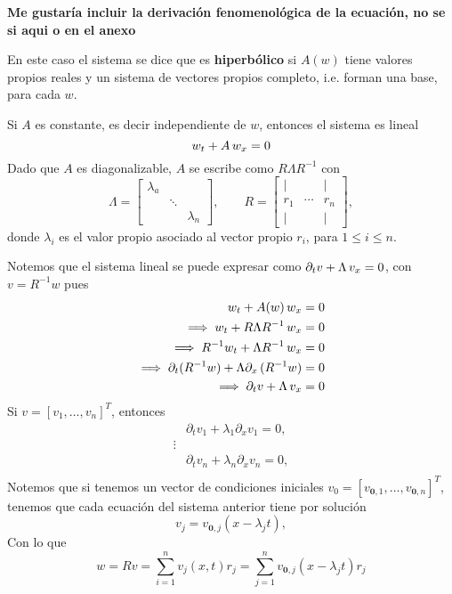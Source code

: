 \textbf{Me gustaría incluir la derivación fenomenológica de la ecuación, no se si aqui o en el anexo}

En este caso el sistema se dice que es \textbf{hiperbólico} si $A(w)$ tiene valores propios reales y un sistema de vectores propios completo, i.e. forman una base, para cada $w$.

Si $A$ es constante, es decir independiente de $w$, entonces el sistema es lineal
\[
w_t + A \thinspace w_x = 0
\]
Dado que $A$ es diagonalizable, $A$ se escribe como $R \Lambda R^{-1}$ con
\[
\Lambda = \begin{bmatrix} \lambda_a & & \\ & \ddots & \\ & & \lambda_n \end{bmatrix},
\qquad 
R = \begin{bmatrix}
    | &  & |\\
    r_1 & \cdots & r_n\\
    | &  & |
  \end{bmatrix},
\]
donde $\lambda_i$ es el valor propio asociado al vector propio $r_i$, para $1 \leq i \leq n$. 

Notemos que el sistema lineal se puede expresar como $\partial_t v + \Lambda \thinspace v_x = 0$, con $v = R^{-1} w$ pues
\begin{align*}
w_t + A(w) \thinspace w_x &= 0 \\
\implies w_t + R \Lambda R^{-1} \thinspace w_x &= 0 \\
\implies R^{-1} w_t + \Lambda R^{-1} \thinspace w_x &= 0 \\
\implies \partial_t(R^{-1} w) + \Lambda \partial_x \thinspace ( R^{-1} w) &= 0 \\
\implies \partial_t v + \Lambda \thinspace v_x &= 0
\end{align*}
Si $v = [v_1, \dots, v_n]^T $, entonces
\begin{align*}
&\partial_t v_1 + \lambda_1 \partial_x v_1 = 0, \\
\vdots \\
&\partial_t v_n + \lambda_n \partial_x v_n = 0, \\
\end{align*}
Notemos que si tenemos un vector de condiciones iniciales $v_0 = [v_{\textbf{0},1}, \dots, v_{\textbf{0},n}]^T$, tenemos que cada ecuación del sistema anterior tiene por solución
\[
v_j = v_{\textbf{0},j} (x - \lambda_j t),
\]
Con lo que 
\[
w = R v = \sum_{i=1}^n v_j(x,t) r_j = \sum_{j=1}^n v_{\textbf{0},j} (x - \lambda_j t) r_j
\]

